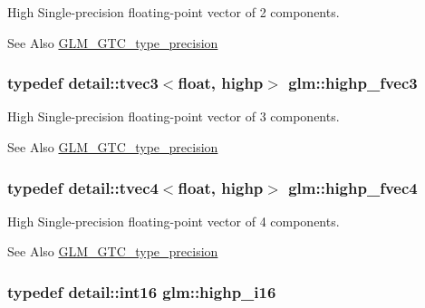 High Single-\/precision floating-\/point vector of 2 components. \begin{DoxySeeAlso}{See Also}
\hyperlink{group__gtc__type__precision}{G\-L\-M\-\_\-\-G\-T\-C\-\_\-type\-\_\-precision} 
\end{DoxySeeAlso}
\hypertarget{group__gtc__type__precision_ga79b821fc8ae989b12bb43e2cd3932580}{
\subsubsection[{highp\-\_\-fvec3}]{\setlength{\rightskip}{0pt plus 5cm}typedef detail\-::tvec3$<$float, highp$>$ {\bf glm\-::highp\-\_\-fvec3}}}\label{group__gtc__type__precision_ga79b821fc8ae989b12bb43e2cd3932580}
High Single-\/precision floating-\/point vector of 3 components. \begin{DoxySeeAlso}{See Also}
\hyperlink{group__gtc__type__precision}{G\-L\-M\-\_\-\-G\-T\-C\-\_\-type\-\_\-precision} 
\end{DoxySeeAlso}
\hypertarget{group__gtc__type__precision_gae0de2413648d89bf5a8e598e5520a439}{
\subsubsection[{highp\-\_\-fvec4}]{\setlength{\rightskip}{0pt plus 5cm}typedef detail\-::tvec4$<$float, highp$>$ {\bf glm\-::highp\-\_\-fvec4}}}\label{group__gtc__type__precision_gae0de2413648d89bf5a8e598e5520a439}
High Single-\/precision floating-\/point vector of 4 components. \begin{DoxySeeAlso}{See Also}
\hyperlink{group__gtc__type__precision}{G\-L\-M\-\_\-\-G\-T\-C\-\_\-type\-\_\-precision} 
\end{DoxySeeAlso}
\hypertarget{group__gtc__type__precision_gaa04399853952dbce29cb62e2432f350a}{
\subsubsection[{highp\-\_\-i16}]{\setlength{\rightskip}{0pt plus 5cm}typedef detail\-::int16 {\bf glm\-::highp\-\_\-i16}}}\label{group__gtc__type__precision_gaa04399853952dbce29cb62e2432f350a}
